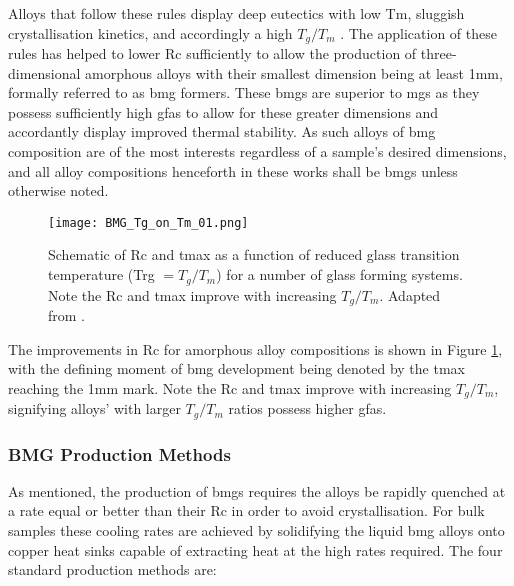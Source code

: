 \documentclass[a4paper,12pt,oneside]{report}%
\begin{document}
Alloys that follow these rules display deep eutectics with low \gls{Tm}, sluggish crystallisation kinetics, and accordingly a high $T_{g}/T_{m}$ \cite{Inoue2000, Schroers2010}. The application of these rules has helped to lower \gls{Rc} sufficiently to allow the production of three-dimensional amorphous alloys with their smallest dimension being at least 1mm, formally referred to as \gls{bmg} formers. These \glspl{bmg} are superior to \glspl{mg} as they possess sufficiently high \glspl{gfa} to allow for these greater dimensions and accordantly display improved thermal stability. As such alloys of \gls{bmg} composition are of the most interests regardless of a sample's desired dimensions, and all alloy compositions henceforth in these works shall be \glspl{bmg} unless otherwise noted. 

\begin{figure}[htb]
	\centering
	\texttt{[image: BMG\_Tg\_on\_Tm\_01.png]}
	\caption[Schematic of \acrfull{Rc} and \acrfull{tmax} as a function of reduced glass transition temperature (\acrshort{Trg} $= T_{g}/T_{m}$) for a number of glass forming systems. Note the \acrshort{Rc} and \acrshort{tmax} improve with increasing $T_{g}/T_{m}$.]{Schematic of \acrfull{Rc} and \acrfull{tmax} as a function of reduced glass transition temperature (\acrshort{Trg} $= T_{g}/T_{m}$) for a number of glass forming systems. Note the \acrshort{Rc} and \acrshort{tmax} improve with increasing $T_{g}/T_{m}$. Adapted from \cite{Trexler2010}.}
	\label{fig:BMGRc}
\end{figure}

The improvements in \gls{Rc} for amorphous alloy compositions is shown in Figure \ref{fig:BMGRc}, with the defining moment of \gls{bmg} development being denoted by the \gls{tmax} reaching the 1mm mark. Note the \gls{Rc} and \gls{tmax} improve with increasing $T_{g}/T_{m}$, signifying alloys' with larger $T_{g}/T_{m}$ ratios possess higher \glspl{gfa}. 

\subsubsection{BMG Production Methods}
As mentioned, the production of \glspl{bmg} requires the alloys be rapidly quenched at a rate equal or better than their \gls{Rc} in order to avoid crystallisation. For bulk samples these cooling rates are achieved by solidifying the liquid \gls{bmg} alloys onto copper heat sinks capable of extracting heat at the high rates required. The four standard production methods are: 
\end{document}
